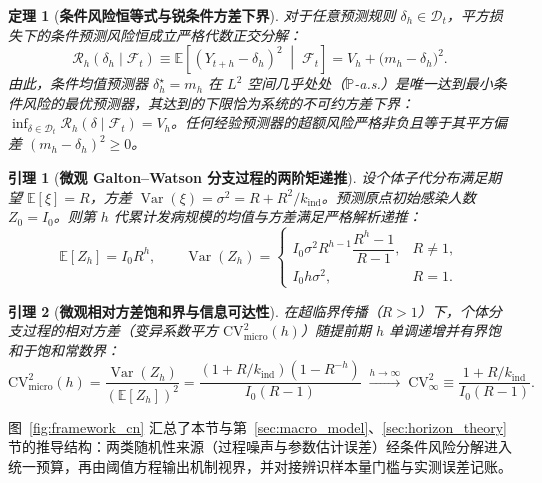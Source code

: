 \documentclass[10pt,UTF8,a4paper,zihao=-4]{ctexart}
\theoremstyle{plain}
\newtheorem{theorem}{定理}
\newtheorem{lemma}{引理}
\theoremstyle{definition}
\theoremstyle{remark}
\begin{document}
\begin{theorem}[\textbf{条件风险恒等式与锐条件方差下界}]\label{thm:sharp_floor}
对于任意预测规则 $\delta_h \in \mathcal{D}_t$，平方损失下的条件预测风险恒成立严格代数正交分解：
\begin{equation}
\mathcal{R}_h(\delta_h \mid \mathcal{F}_t) \equiv \mathbb{E}\left[(Y_{t+h} - \delta_h)^2 \;\middle|\; \mathcal{F}_t\right] = V_h + \bigl(m_h - \delta_h\bigr)^2. \label{eq:sharp_floor_identity}
\end{equation}
由此，条件均值预测器 $\delta_h^\star = m_h$ 在 $L^2$ 空间几乎处处（$\mathbb{P}$-a.s.）是唯一达到最小条件风险的最优预测器，其达到的下限恰为系统的不可约方差下界：$\inf_{\delta \in \mathcal{D}_t} \mathcal{R}_h(\delta \mid \mathcal{F}_t) = V_h$。任何经验预测器的超额风险严格非负且等于其平方偏差 $(m_h - \delta_h)^2 \ge 0$。
\end{theorem}

\begin{lemma}[\textbf{微观 Galton--Watson 分支过程的两阶矩递推}]\label{lem:branch_moments}
设个体子代分布满足期望 $\mathbb{E}[\xi]=R$，方差 $\operatorname{Var}(\xi)=\sigma^2 = R + R^2/k_{\text{ind}}$。预测原点初始感染人数 $Z_0 = I_0$。则第 $h$ 代累计发病规模的均值与方差满足严格解析递推：
\begin{equation}
\mathbb{E}[Z_h] = I_0 R^h, \qquad \operatorname{Var}(Z_h) = \begin{cases} I_0 \sigma^2 R^{h-1} \dfrac{R^h - 1}{R - 1}, & R \neq 1, \\[6pt] I_0 h \sigma^2, & R = 1. \end{cases} \label{eq:lem1_var}
\end{equation}
\end{lemma}

\begin{lemma}[\textbf{微观相对方差饱和界与信息可达性}]\label{lem:cv_floor}
在超临界传播（$R > 1$）下，个体分支过程的相对方差（变异系数平方 $\text{CV}^2_{\text{micro}}(h)$）随提前期 $h$ 单调递增并有界饱和于饱和常数界：
\begin{equation}
\text{CV}^2_{\text{micro}}(h) = \frac{\operatorname{Var}(Z_h)}{(\mathbb{E}[Z_h])^2} = \frac{(1 + R/k_{\text{ind}})(1 - R^{-h})}{I_0(R - 1)} \;\xrightarrow{h \to \infty}\; \text{CV}^2_\infty \equiv \frac{1 + R/k_{\text{ind}}}{I_0(R - 1)}. \label{eq:cv_floor}
\end{equation}
\end{lemma}

图~\ref{fig:framework_cn} 汇总了本节与第~\ref{sec:macro_model}、\ref{sec:horizon_theory} 节的推导结构：两类随机性来源（过程噪声与参数估计误差）经条件风险分解进入统一预算，再由阈值方程输出机制视界，并对接辨识样本量门槛与实测误差记账。
\end{document}
